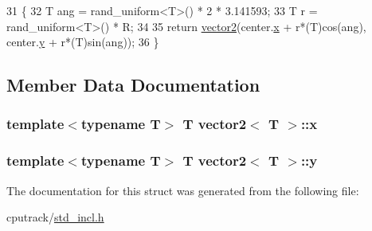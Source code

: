 \begin{DoxyCode}
31     \{
32         T ang = rand\_uniform<T>() * 2 * 3.141593;
33         T r = rand\_uniform<T>() * R;
34 
35         \textcolor{keywordflow}{return} \hyperlink{structvector2_a6e939afd4c849f78ff033065b778d4e0}{vector2}(center.\hyperlink{structvector2_a22b63498d8e4abf9a2da054a247965b9}{x} + r*(T)cos(ang), center.\hyperlink{structvector2_a00b3268bc895adddf0b72d6acd8274a7}{y} + r*(T)sin(ang));
36     \}
\end{DoxyCode}


\subsection{Member Data Documentation}
\subsubsection[{\texorpdfstring{x}{x}}]{\setlength{\rightskip}{0pt plus 5cm}template$<$typename T$>$ T {\bf vector2}$<$ T $>$\+::x}\hypertarget{structvector2_a22b63498d8e4abf9a2da054a247965b9}{}\label{structvector2_a22b63498d8e4abf9a2da054a247965b9}
\subsubsection[{\texorpdfstring{y}{y}}]{\setlength{\rightskip}{0pt plus 5cm}template$<$typename T$>$ T {\bf vector2}$<$ T $>$\+::y}\hypertarget{structvector2_a00b3268bc895adddf0b72d6acd8274a7}{}\label{structvector2_a00b3268bc895adddf0b72d6acd8274a7}


The documentation for this struct was generated from the following file\+:\begin{DoxyCompactItemize}
\item 
cputrack/\hyperlink{std__incl_8h}{std\+\_\+incl.\+h}\end{DoxyCompactItemize}
